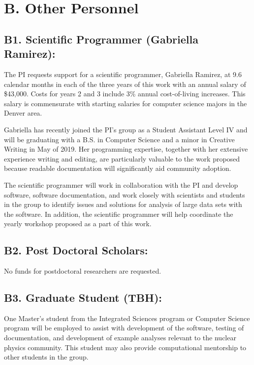 \documentclass[11pt,oneside]{memoir}
\begin{document}
\section*{B. Other Personnel}

\subsection*{B1. Scientific Programmer (Gabriella Ramirez):}
The PI requests support for a scientific programmer, Gabriella Ramirez, at 9.6 calendar months in each of the three years of this work with an annual salary of \$43,000. Costs for years 2 and 3 include 3\% annual  cost-of-living increases.  This salary is commensurate with starting salaries for computer science majors in the Denver area.

Gabriella has recently joined the PI's group as a Student Assistant Level IV and will be graduating with a B.S. in Computer Science and a minor in Creative Writing in May of 2019.  Her programming expertise, together with her extensive experience writing and editing, are particularly valuable to the work proposed because readable documentation will significantly aid community adoption.

The scientific programmer will work in collaboration with the PI and develop software, software documentation, and work closely with scientists and students in the group to identify issues and solutions for analysis of large data sets with the software.  In addition, the scientific programmer will help coordinate the yearly workshop proposed as a part of this work.


\subsection{B2.  Post Doctoral Scholars:}

No funds for postdoctoral researchers are requested.


\subsection[B3]{B3. Graduate Student (TBH):} 
\label{sec:masters-student-salary}
One Master's student from the Integrated Sciences program or Computer Science program will be employed to assist with development of the software, testing of documentation, and development of example analyses relevant to the nuclear physics community.  This student may also provide computational mentorship to other students in the group.  
\end{document}
